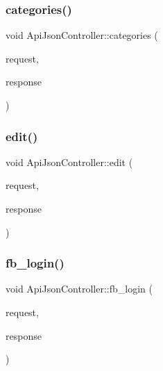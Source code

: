 \mbox{\label{classApiJsonController_a517f518559e86d3b5d1ce962a187694e}} 
\subsubsection{\texorpdfstring{categories()}{categories()}}
{\footnotesize\ttfamily void Api\+Json\+Controller\+::categories (\begin{DoxyParamCaption}\item[{Mongoose\+::\+Request \&}]{request,  }\item[{Mongoose\+::\+Json\+Response \&}]{response }\end{DoxyParamCaption})}

\mbox{\label{classApiJsonController_aaac98bdb7d1dc373db45f81cde5a2ba1}} 
\subsubsection{\texorpdfstring{edit()}{edit()}}
{\footnotesize\ttfamily void Api\+Json\+Controller\+::edit (\begin{DoxyParamCaption}\item[{Mongoose\+::\+Request \&}]{request,  }\item[{Mongoose\+::\+Json\+Response \&}]{response }\end{DoxyParamCaption})}

\mbox{\label{classApiJsonController_a4e1c8c117457100c5297cfac507e78ef}} 
\subsubsection{\texorpdfstring{fb\+\_\+login()}{fb\_login()}}
{\footnotesize\ttfamily void Api\+Json\+Controller\+::fb\+\_\+login (\begin{DoxyParamCaption}\item[{Mongoose\+::\+Request \&}]{request,  }\item[{Mongoose\+::\+Json\+Response \&}]{response }\end{DoxyParamCaption})}

